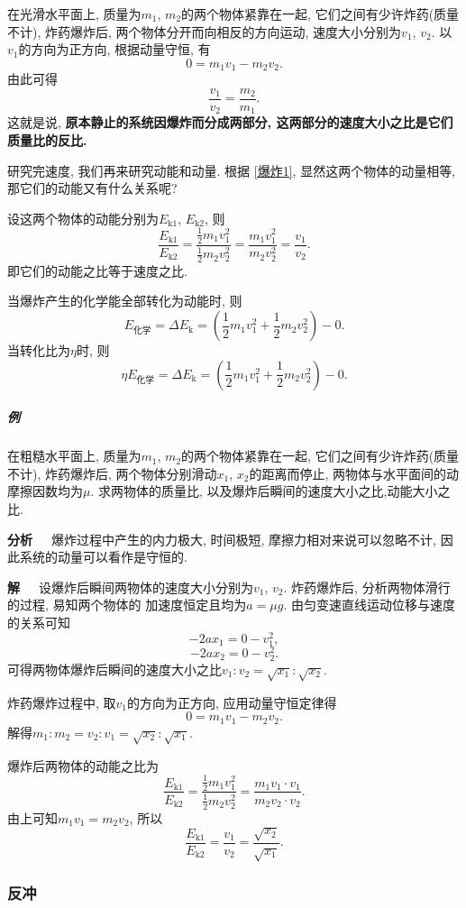 \documentclass[12pt,a4paper]{ctexart}
\newcounter{exam}[section]
\newcommand{\bre}{\ \ \ }
\begin{document}
在光滑水平面上, 质量为$m_1$, $m_2$的两个物体紧靠在一起, 它们之间有少许炸药(质量不计), 炸药爆炸后,
两个物体分开而向相反的方向运动, 速度大小分别为$v_1$, $v_2$. 以
$v_1$的方向为正方向, 根据动量守恒, 有
\begin{equation}
    0 = m_1v_1 - m_2v_2.
    \label{爆炸1}
\end{equation}
由此可得$$\frac{v_1}{v_2} = \frac{m_2}{m_1}.$$
这就是说, \textbf{原本静止的系统因爆炸而分成两部分, 这两部分的速度大小之比是它们质量比的反比.}

研究完速度, 我们再来研究动能和动量. 根据 \eqref{爆炸1}, 显然这两个物体的动量相等, 那它们的动能又有什么关系呢?

设这两个物体的动能分别为$E_\mathrm{k1}$, $E_\mathrm{k2}$, 则
$$\frac{E_\mathrm{k1}}{E_\mathrm{k2}} = \frac{\frac12 m_1v_1^2}{\frac12m_2v_2^2} = \frac{m_1v_1^2}{m_2v_2^2} = \frac{v_1}{v_2}.$$
即它们的动能之比等于速度之比.

当爆炸产生的化学能全部转化为动能时, 则
$$E_\text{化学} = \Delta E_\mathrm{k} = \left(\frac12m_1v_1^2 + \frac12m_2v_2^2\right)-0.$$
当转化比为$\eta$时, 则
$$\eta E_\text{化学} = \Delta E_\mathrm{k} = \left(\frac12m_1v_1^2 + \frac12m_2v_2^2\right)-0.$$

\subparagraph{例\theexam} 在粗糙水平面上, 质量为$m_1$, $m_2$的两个物体紧靠在一起,
它们之间有少许炸药(质量不计), 炸药爆炸后,
两个物体分别滑动$x_1$, $x_2$的距离而停止,
两物体与水平面间的动摩擦因数均为$\mu$.
求两物体的质量比, 以及爆炸后瞬间的速度大小之比,动能大小之比.

\textbf{分析}\bre 爆炸过程中产生的内力极大, 时间极短, 摩擦力相对来说可以忽略不计,
因此系统的动量可以看作是守恒的.

\textbf{解}\bre 设爆炸后瞬间两物体的速度大小分别为$v_1$, $v_2$.
炸药爆炸后, 分析两物体滑行的过程, 易知两个物体的
加速度恒定且均为$a = \mu g$. 由匀变速直线运动位移与速度的关系可知
$$-2ax_1 = 0 - v_1^2,$$ $$-2ax_2 = 0 - v_2^2.$$
可得两物体爆炸后瞬间的速度大小之比$v_1:v_2 = \sqrt{x_1}:\sqrt{x_2}$.

炸药爆炸过程中, 取$v_1$的方向为正方向, 应用动量守恒定律得
$$0 = m_1v_1 - m_2v_2.$$
解得$m_1:m_2 = v_2:v_1 = \sqrt{x_2}:\sqrt{x_1}$.

爆炸后两物体的动能之比为
$$\frac{E_\mathrm{k1}}{E_\mathrm{k2}} = \frac{\frac12 m_1v_1^2}{\frac12m_2v_2^2}=\frac{m_1v_1\cdot v_1}{m_2v_2\cdot v_2}.$$
由上可知$m_1v_1 = m_2v_2$, 所以$$\frac{E_\mathrm{k1}}{E_\mathrm{k2}} =\frac{v_1}{v_2} = \frac{\sqrt{x_2}}{\sqrt{x_1}}.$$

\subsubsection{反冲}
\end{document}
